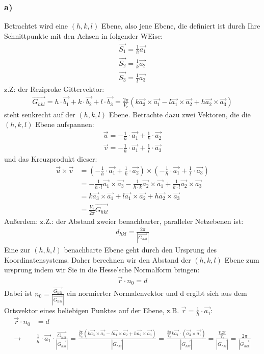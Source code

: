 \documentclass[11pt]{article}
\begin{document}
\subsubsection*{a)}
Betrachtet wird eine $(h,k,l)$ Ebene, also jene Ebene, die definiert ist durch Ihre Schnittpunkte mit den Achsen in folgender WEise:
\begin{align*}
\vec{S_1}=\frac{1}{h}\vec{a_1}\\
\vec{S_2}=\frac{1}{k}\vec{a_2}\\
\vec{S_3}=\frac{1}{l}\vec{a_3}
\end{align*}
z.Z: der Reziproke Gittervektor:
\begin{align*}
\vec{G_{hkl}}=h\cdot\vec{b_1}+k\cdot\vec{b_2}+l\cdot\vec{b_3} = \frac{2\pi}{V_e}(k\vec{a_3}\times\vec{a_1}-l\vec{a_1}\times\vec{a_2}+h\vec{a_2}\times\vec{a_3})
\end{align*}
steht senkrecht auf der $(h,k,l)$ Ebene. Betrachte dazu zwei Vektoren, die die $(h,k,l)$ Ebene aufspannen:
\begin{align*}
\vec{u}=-\frac{1}{h}\cdot\vec{a_1}+\frac{1}{k}\cdot\vec{a_2}\\
\vec{v}=-\frac{1}{h}\cdot\vec{a_1}+\frac{1}{l}\cdot\vec{a_3}
\end{align*}
und das Kreuzprodukt dieser:
\begin{align*}
\vec{u}\times\vec{v} &= (-\frac{1}{h}\cdot\vec{a_1}+\frac{1}{k}\cdot\vec{a_2})\times(-\frac{1}{h}\cdot\vec{a_1}+\frac{1}{l}\cdot\vec{a_3})\\
&= -\frac{1}{h\cdot l}\vec{a_1}\times\vec{a_3}-\frac{1}{h\cdot k}\vec{a_2}\times\vec{a_1}+\frac{1}{k\cdot l}\vec{a_2}\times\vec{a_3}\\
&= k\vec{a_3}\times\vec{a_1}+l\vec{a_1}\times\vec{a_2}+h\vec{a_2}\times\vec{a_3}\\
&= \frac{V_e}{2\pi}\vec{G_{hkl}}
\end{align*}
Außerdem: z.Z.: der Abstand zweier benachbarter, paralleler Netzebenen ist:
\begin{align*}
d_{hkl}=\frac{2\pi}{|\vec{G_{hkl}}|}
\end{align*}
Eine zur $(h,k,l)$ benachbarte Ebene geht durch den Ursprung des Koordinatensystems. Daher berechnen wir den Abstand der $(h,k,l)$ Ebene zum ursprung indem wir Sie in die Hesse'sche Normalform bringen:
\begin{align*}
\vec{r}\cdot n_0 = d
\end{align*}
Dabei ist $n_0 = \frac{\vec{G_{hkl}}}{|\vec{G_{hkl}}|}$ ein normierter Normalenvektor und d ergibt sich aus dem Ortsvektor eines beliebigen Punktes auf der Ebene, z.B. $\vec{r}=\frac{1}{h}\cdot\vec{a_1}$:
\begin{align*}
\vec{r}\cdot n_0 &= d\\
\rightarrow &\frac{1}{h}\cdot\vec{a_1}\cdot\frac{\vec{G_{hkl}}}{|\vec{G_{hkl}}|} = \frac{\frac{2\pi}{V_e}(k\vec{a_3}\times\vec{a_1}-l\vec{a_1}\times\vec{a_2}+h\vec{a_2}\times\vec{a_3})}{|\vec{G_{hkl}}|} = \frac{\frac{2\pi}{V_e}k\vec{a_1}\cdot(\vec{a_3}\times\vec{a_1})}{|\vec{G_{hkl}}|} = \frac{\frac{V_e 2\pi}{V_e}}{|\vec{G_{hkl}}|} =\frac{2\pi}{|\vec{G_{hkl}}|} 
\end{align*}
\end{document}
